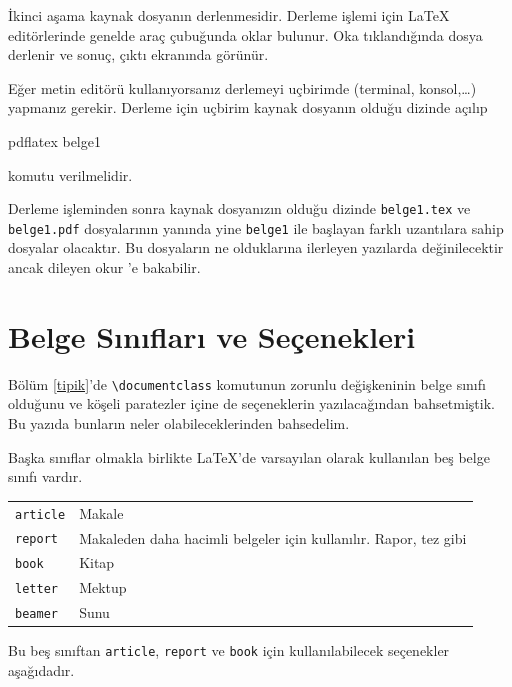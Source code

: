 \documentclass[
  10pt,
]{scrbook}
\newenvironment{Shaded}{\begin{snugshade}}{\end{snugshade}}
\newcommand{\NormalTok}[1]{#1}
\begin{document}
İkinci aşama kaynak dosyanın derlenmesidir. Derleme işlemi için LaTeX
editörlerinde genelde araç çubuğunda oklar bulunur. Oka tıklandığında
dosya derlenir ve sonuç, çıktı ekranında görünür.

Eğer metin editörü kullanıyorsanız derlemeyi uçbirimde (terminal,
konsol,\ldots) yapmanız gerekir. Derleme için uçbirim kaynak dosyanın
olduğu dizinde açılıp

\begin{Shaded}
\begin{Highlighting}[]
\NormalTok{pdflatex belge1}
\end{Highlighting}
\end{Shaded}

komutu verilmelidir.

Derleme işleminden sonra kaynak dosyanızın olduğu dizinde \texttt{belge1.tex}
ve \texttt{belge1.pdf} dosyalarının yanında yine \texttt{belge1} ile başlayan farklı
uzantılara sahip dosyalar olacaktır. Bu dosyaların ne olduklarına
ilerleyen yazılarda değinilecektir ancak dileyen okur \citep[s. 13-14]{Oetiker}'e bakabilir.

\hypertarget{belgesinifi}{%
\section{Belge Sınıfları ve Seçenekleri}\label{belgesinifi}}

Bölüm \ref{tipik}'de \texttt{\textbackslash{}documentclass} komutunun zorunlu değişkeninin belge
sınıfı olduğunu ve köşeli paratezler içine de seçeneklerin
yazılacağından bahsetmiştik. Bu yazıda bunların neler olabileceklerinden
bahsedelim.

Başka sınıflar olmakla birlikte LaTeX'de varsayılan olarak kullanılan
beş belge sınıfı vardır.

\begin{longtable}[]{@{}ll@{}}
\toprule
\endhead
\texttt{article} & Makale \\
\texttt{report} & Makaleden daha hacimli belgeler için kullanılır. Rapor, tez gibi \\
\texttt{book} & Kitap \\
\texttt{letter} & Mektup \\
\texttt{beamer} & Sunu \\
\bottomrule
\end{longtable}

Bu beş sınıftan \texttt{article}, \texttt{report} ve \texttt{book} için kullanılabilecek
seçenekler aşağıdadır.
\end{document}
